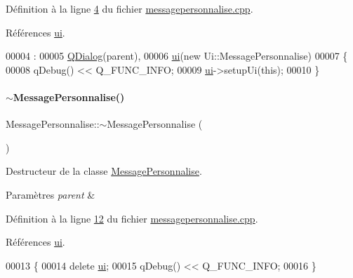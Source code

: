 Définition à la ligne \hyperlink{messagepersonnalise_8cpp_source_l00004}{4} du fichier \hyperlink{messagepersonnalise_8cpp_source}{messagepersonnalise.\+cpp}.



Références \hyperlink{messagepersonnalise_8h_source_l00037}{ui}.


\begin{DoxyCode}
00004                                                         :
00005     \hyperlink{class_q_dialog}{QDialog}(parent),
00006     \hyperlink{class_message_personnalise_a94bdf252f3e858ec1c2ed354d31a91e3}{ui}(\textcolor{keyword}{new} Ui::MessagePersonnalise)
00007 \{
00008      qDebug() << Q\_FUNC\_INFO;
00009     \hyperlink{class_message_personnalise_a94bdf252f3e858ec1c2ed354d31a91e3}{ui}->setupUi(\textcolor{keyword}{this});
00010 \}
\end{DoxyCode}
\mbox{\label{class_message_personnalise_aff9181649ac956114f02660582e86cfc}} 
\paragraph{\texorpdfstring{$\sim$\+Message\+Personnalise()}{~MessagePersonnalise()}}
{\footnotesize\ttfamily Message\+Personnalise\+::$\sim$\+Message\+Personnalise (\begin{DoxyParamCaption}{ }\end{DoxyParamCaption})}



Destructeur de la classe \hyperlink{class_message_personnalise}{Message\+Personnalise}. 


\begin{DoxyParams}{Paramètres}
{\em parent} & \\
\hline
\end{DoxyParams}


Définition à la ligne \hyperlink{messagepersonnalise_8cpp_source_l00012}{12} du fichier \hyperlink{messagepersonnalise_8cpp_source}{messagepersonnalise.\+cpp}.



Références \hyperlink{messagepersonnalise_8h_source_l00037}{ui}.


\begin{DoxyCode}
00013 \{
00014     \textcolor{keyword}{delete} \hyperlink{class_message_personnalise_a94bdf252f3e858ec1c2ed354d31a91e3}{ui};
00015     qDebug() << Q\_FUNC\_INFO;
00016 \}
\end{DoxyCode}



